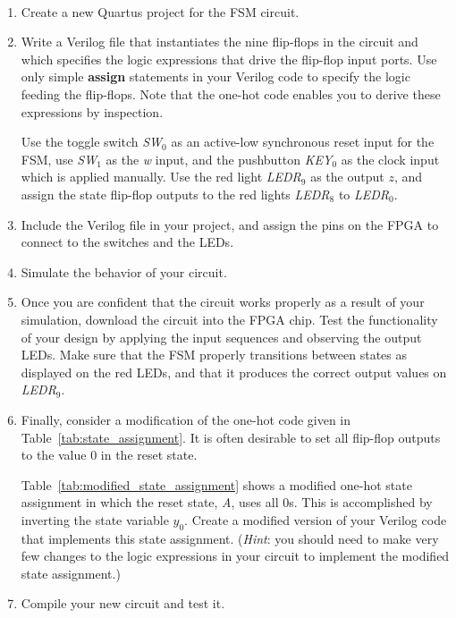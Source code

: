 \documentclass[epsfig,10pt,fullpage]{article}
\begin{document}
\begin{enumerate}
\item Create a new Quartus\textsuperscript{\textregistered} project for the FSM circuit. 

\item Write a Verilog file that instantiates the nine flip-flops in the circuit and which
specifies the logic expressions that drive the flip-flop input ports. Use only
simple {\bf assign} statements in your Verilog code to specify the logic feeding the
flip-flops. Note that the one-hot code enables you to derive these expressions by
inspection.

Use the toggle switch {\it SW}$_0$ as an active-low synchronous reset input
for the FSM, use {\it SW}$_1$ as the {\it w} input, and the pushbutton {\it KEY}$_0$ as the clock input which 
is applied manually.  Use the red light {\it LEDR}$_9$ as the output $z$, 
and assign the state flip-flop outputs to the red lights {\it LEDR}$_8$ to {\it LEDR}$_0$.

\item Include the Verilog file in your project, and assign the pins on the FPGA to 
connect to the switches and the LEDs.

\item Simulate the behavior of your circuit.

\item Once you are confident that the circuit works properly as a result of your
simulation, download the circuit into the FPGA chip.  Test the functionality of your 
design by applying the input sequences and observing the output LEDs. Make sure that the
FSM properly transitions between states as displayed on the red LEDs, and that it produces
the correct output values on {\it LEDR}$_9$.

\item Finally, consider a modification of the one-hot code given in Table~\ref{tab:state_assignment}. It is often 
desirable to set all flip-flop outputs to the value 0 in the reset state.

Table~\ref{tab:modified_state_assignment} shows a modified one-hot state assignment in which the reset state, {\it A},
uses all 0s. This is accomplished by inverting the state variable $y_0$. 
Create a modified version of your Verilog code that implements this state
assignment. ({\it Hint}: you should need to make very few changes to the logic expressions
in your circuit to implement the modified state assignment.) 

\item Compile your new circuit and test it.


\end{enumerate}
\end{document}
